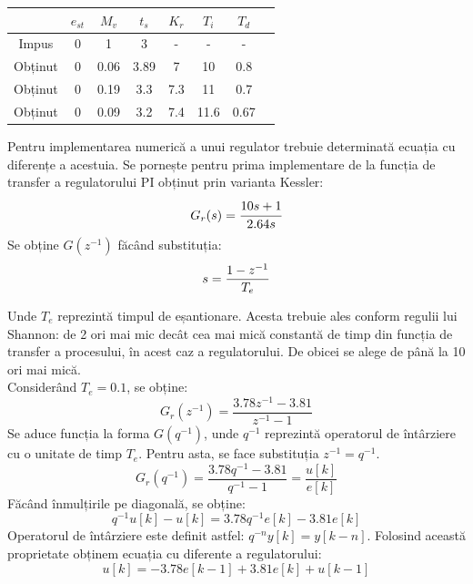 \documentclass[11pt]{article}
\newcommand{\EqRow}{\vspace{1.5mm}}
\begin{document}
\begin{center}
	\begin{tabular}{|c|c|c|c|c|c|c|c|}
		\hline
		&$e_{st}$&$M_v$&$t_s$&$K_r$&$T_i$&$T_d$\\
		\hline
		Impus&0&1&3&-&-&-\\
		\hline
		Obținut&0&0.06&3.89&7&10&0.8\\
		Obținut&0&0.19&3.3&7.3&11&0.7\\
		Obținut&0&0.09&3.2&7.4&11.6&0.67\\
		\hline
	\end{tabular}
\end{center}
\EqRow
Pentru implementarea numerică a unui regulator trebuie determinată ecuația cu diferențe a acestuia.
Se pornește pentru prima implementare de la funcția de transfer a regulatorului PI obținut prin varianta Kessler:
$$G_r(s)=\cfrac{10s+1}{2.64s}\EqRow$$
Se obține $G(z^{-1})$ făcând substituția:
$$s=\frac{1-z^{-1}}{T_e}\EqRow$$

Unde $T_e$ reprezintă timpul de eșantionare. Acesta trebuie ales conform regulii lui Shannon: de 2 ori mai mic decât cea mai mică constantă de timp din funcția de transfer a procesului, în acest caz a regulatorului. De obicei se alege de până la 10 ori mai mică.\\
Considerând $T_e=0.1$, se obține:
$$G_r(z^{-1})=\frac{3.78z^{-1}-3.81}{z^{-1}-1}$$
Se aduce funcția la forma $G(q^{-1})$, unde $q^{-1}$ reprezintă operatorul de întârziere cu o unitate de timp $T_e$.
Pentru asta, se face substituția $z^{-1}=q^{-1}$.
$$G_r(q^{-1})=\frac{3.78q^{-1}-3.81}{q^{-1}-1}=\frac{u[k]}{e[k]}$$
Făcând înmulțirile pe diagonală, se obține:
$$q^{-1}u[k]-u[k]=3.78q^{-1}e[k]-3.81e[k]$$
Operatorul de întârziere este definit astfel: $q^{-n}y[k]=y[k-n]$. Folosind această proprietate obținem ecuația cu diferente a regulatorului:
$$u[k]=-3.78e[k-1]+3.81e[k]+u[k-1]$$
\end{document}
